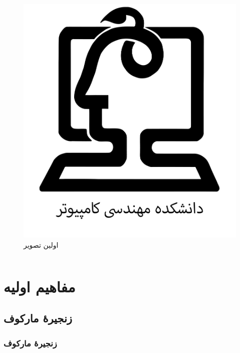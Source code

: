 \documentclass[xcolor=dvipsnames, professionalfonts, aspectratio=169, 11pt]{beamer}
\begin{document}
\begin{persian}
\begin{frame}
\begin{columns}[onlytextwidth]
\begin{column}{.6\textwidth}
\begin{enumerate}
\begin{enumerate}
				\end{enumerate}
			\end{enumerate}
			\begin{figure}
				\vspace{-1em}
				\includegraphics[height=0.35\textheight]{img/logo-ce.png}
				\caption{اولین تصویر }
			\end{figure}
		\end{column}
	\end{columns}
	
\end{frame}









\section{مفاهیم اولیه}
\subsection{زنجیرهٔ مارکوف}
\begin{frame}
	\frametitle{زنجیرهٔ مارکوف}
	

\end{frame}
\end{persian}
\end{document}
